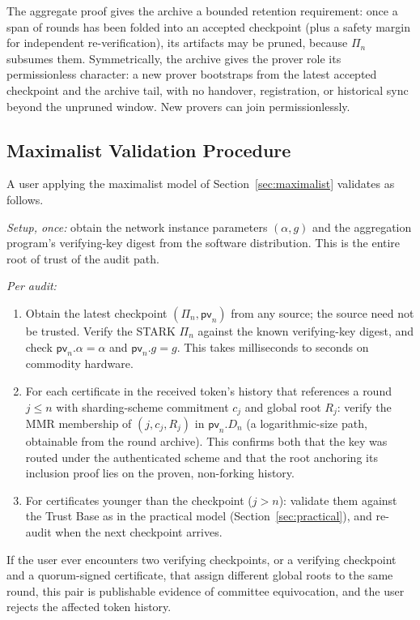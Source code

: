 \documentclass[11pt]{article}
\begin{document}
The aggregate proof gives the archive a bounded retention requirement: once a span of rounds has been folded into an accepted checkpoint (plus a safety margin for independent re-verification), its artifacts may be pruned, because $\Pi_n$ subsumes them. Symmetrically, the archive gives the prover role its permissionless character: a new prover bootstraps from the latest accepted checkpoint and the archive tail, with no handover, registration, or historical sync beyond the unpruned window. New provers can join permissionlessly.

\subsection{Maximalist Validation Procedure}
\label{sec:maxi-validation}

A user applying the maximalist model of Section~\ref{sec:maximalist} validates as follows.

\emph{Setup, once:} obtain the network instance parameters $(\alpha, g)$ and the aggregation program's verifying-key digest from the software distribution. This is the entire root of trust of the audit path.

\emph{Per audit:}
\begin{enumerate}[nosep]
  \item Obtain the latest checkpoint $(\Pi_n, \mathsf{pv}_n)$ from any source; the source need not be trusted. Verify the STARK $\Pi_n$ against the known verifying-key digest, and check $\mathsf{pv}_n.\alpha = \alpha$ and $\mathsf{pv}_n.g = g$. This takes milliseconds to seconds on commodity hardware.
  \item For each certificate in the received token's history that references a round $j \leq n$ with sharding-scheme commitment $c_j$ and global root $R_j$: verify the MMR membership of $(j,c_j,R_j)$ in $\mathsf{pv}_n.D_n$ (a logarithmic-size path, obtainable from the round archive). This confirms both that the key was routed under the authenticated scheme and that the root anchoring its inclusion proof lies on the proven, non-forking history.
  \item For certificates younger than the checkpoint ($j > n$): validate them against the Trust Base as in the practical model (Section~\ref{sec:practical}), and re-audit when the next checkpoint arrives.
\end{enumerate}

If the user ever encounters two verifying checkpoints, or a verifying checkpoint and a quorum-signed certificate, that assign different global roots to the same round, this pair is publishable evidence of committee equivocation, and the user rejects the affected token history.
\end{document}
